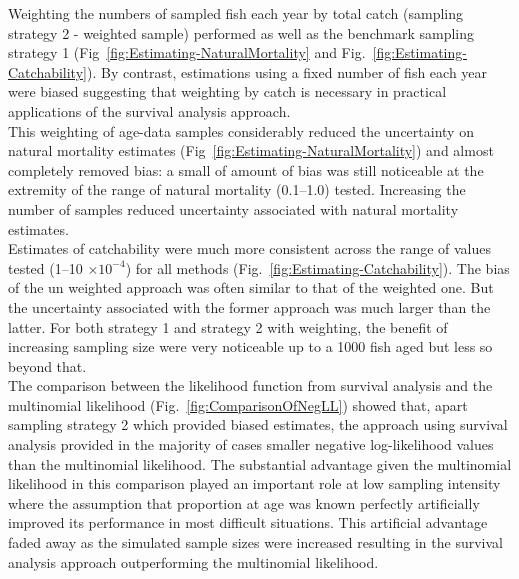 Weighting the numbers of sampled fish each year by total catch (sampling strategy 2 - weighted sample) performed as well as the benchmark sampling strategy 1 (Fig~\ref{fig:Estimating-NaturalMortality} and Fig.~\ref{fig:Estimating-Catchability}). By contrast, estimations using a fixed number of fish each year were biased suggesting that weighting by catch is necessary in practical applications of the survival analysis approach. \\

This weighting of age-data samples considerably reduced the uncertainty on natural mortality estimates (Fig~\ref{fig:Estimating-NaturalMortality}) and almost completely removed bias: a small of amount of bias was still noticeable at the extremity of the range of natural mortality (0.1--1.0) tested. Increasing the number of samples reduced uncertainty associated with natural mortality estimates. \\ 

Estimates of catchability were much more consistent across the range of values tested (1--10 $ \times 10^{-4}$) for all methods (Fig.~\ref{fig:Estimating-Catchability}). The bias of the un weighted approach was often similar to that of the weighted one. But the uncertainty associated with the former approach was much larger than the latter. For both strategy 1 and strategy 2 with weighting, the benefit of increasing sampling size were very noticeable up to a 1000 fish aged but less so beyond that.\\

The comparison between the likelihood function from survival analysis and the multinomial likelihood (Fig.~\ref{fig:ComparisonOfNegLL}) showed that, apart sampling strategy 2 which provided biased estimates, the approach using survival analysis provided in the majority of cases smaller negative log-likelihood values than the multinomial likelihood. The substantial advantage given the multinomial likelihood in this comparison played an important role at low sampling intensity where the assumption that proportion at age was known perfectly artificially improved its performance in most difficult situations. This artificial advantage faded away as the simulated sample sizes were increased resulting in the survival analysis approach outperforming the multinomial likelihood. \\

